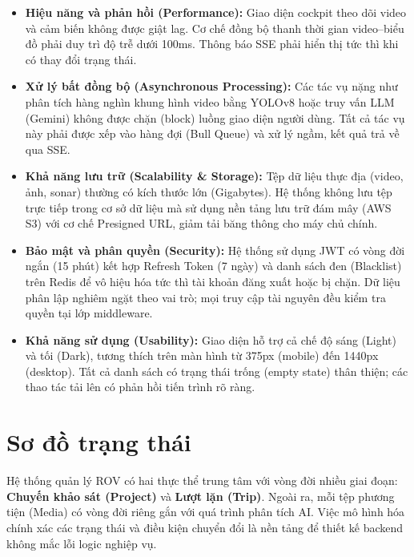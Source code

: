 \documentclass[../DoAn.tex]{subfiles}
\begin{document}
\begin{itemize}[leftmargin=*, topsep=4pt, itemsep=4pt]
  \item \textbf{Hiệu năng và phản hồi (Performance):} Giao diện cockpit theo dõi video và cảm biến không được giật lag. Cơ chế đồng bộ thanh thời gian video--biểu đồ phải duy trì độ trễ dưới 100ms. Thông báo SSE phải hiển thị tức thì khi có thay đổi trạng thái.

  \item \textbf{Xử lý bất đồng bộ (Asynchronous Processing):} Các tác vụ nặng như phân tích hàng nghìn khung hình video bằng YOLOv8 hoặc truy vấn LLM (Gemini) không được chặn (block) luồng giao diện người dùng. Tất cả tác vụ này phải được xếp vào hàng đợi (Bull Queue) và xử lý ngầm, kết quả trả về qua SSE.

  \item \textbf{Khả năng lưu trữ (Scalability \& Storage):} Tệp dữ liệu thực địa (video, ảnh, sonar) thường có kích thước lớn (Gigabytes). Hệ thống không lưu tệp trực tiếp trong cơ sở dữ liệu mà sử dụng nền tảng lưu trữ đám mây (AWS S3) với cơ chế Presigned URL, giảm tải băng thông cho máy chủ chính.

  \item \textbf{Bảo mật và phân quyền (Security):} Hệ thống sử dụng JWT có vòng đời ngắn (15 phút) kết hợp Refresh Token (7 ngày) và danh sách đen (Blacklist) trên Redis để vô hiệu hóa tức thì tài khoản đăng xuất hoặc bị chặn. Dữ liệu phân lập nghiêm ngặt theo vai trò; mọi truy cập tài nguyên đều kiểm tra quyền tại lớp middleware.

  \item \textbf{Khả năng sử dụng (Usability):} Giao diện hỗ trợ cả chế độ sáng (Light) và tối (Dark), tương thích trên màn hình từ 375px (mobile) đến 1440px (desktop). Tất cả danh sách có trạng thái trống (empty state) thân thiện; các thao tác tải lên có phản hồi tiến trình rõ ràng.
\end{itemize}

\section{Sơ đồ trạng thái}
\label{section:2.5}

Hệ thống quản lý ROV có hai thực thể trung tâm với vòng đời nhiều giai đoạn: \textbf{Chuyến khảo sát (Project)} và \textbf{Lượt lặn (Trip)}. Ngoài ra, mỗi tệp phương tiện (Media) có vòng đời riêng gắn với quá trình phân tích AI. Việc mô hình hóa chính xác các trạng thái và điều kiện chuyển đổi là nền tảng để thiết kế backend không mắc lỗi logic nghiệp vụ.
\end{document}
